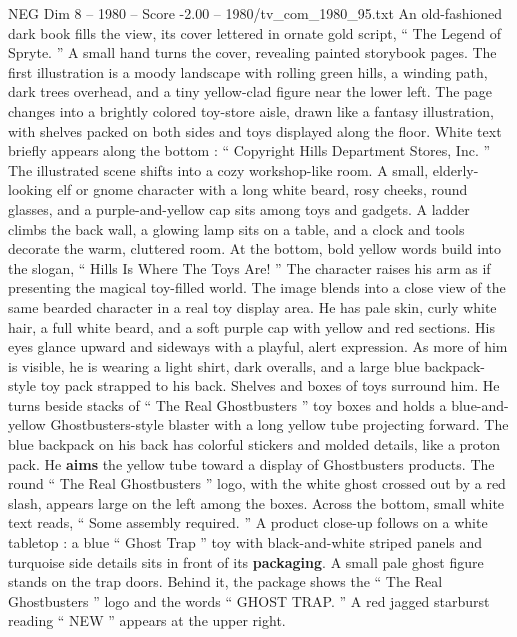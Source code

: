 \begin{textsample}{NEG Dim 8 – 1980 – Score -2.00 – 1980/tv\_com\_1980\_95.txt}  \label{ex:f8_neg_060}
An old-fashioned dark book fills the view, its cover lettered in ornate gold script, “ The Legend of Spryte. ” A small hand turns the cover, revealing painted storybook pages.
The first illustration is a moody landscape with rolling green hills, a winding path, dark trees overhead, and a tiny yellow-clad figure near the lower left.
The page changes into a brightly colored toy-store aisle, drawn like a fantasy illustration, with shelves packed on both sides and toys displayed along the floor.
White text briefly appears along the bottom : “ Copyright Hills Department Stores, Inc. ” The illustrated scene shifts into a cozy workshop-like room.
A small, elderly-looking elf or gnome character with a long white beard, rosy cheeks, round glasses, and a purple-and-yellow cap sits among toys and gadgets.
A ladder climbs the back wall, a glowing lamp sits on a table, and a clock and tools decorate the warm, cluttered room.
At the bottom, bold yellow words build into the slogan, “ Hills Is Where The Toys Are! ” The character raises his arm as if presenting the magical toy-filled world.
The image blends into a close view of the same bearded character in a real toy display area.
He has pale skin, curly white hair, a full white beard, and a soft purple cap with yellow and red sections.
His eyes glance upward and sideways with a playful, alert expression.
As more of him is visible, he is wearing a light shirt, dark overalls, and a large blue backpack-style toy pack strapped to his back.
Shelves and boxes of toys surround him.
He turns beside stacks of “ The Real Ghostbusters ” toy boxes and holds a blue-and-yellow Ghostbusters-style blaster with a long yellow tube projecting forward.
The blue backpack on his back has colorful stickers and molded details, like a proton pack.
He \textbf{aims} the yellow tube toward a display of Ghostbusters products.
The round “ The Real Ghostbusters ” logo, with the white ghost crossed out by a red slash, appears large on the left among the boxes.
Across the bottom, small white text reads, “ Some assembly required. ” A product close-up follows on a white tabletop : a blue “ Ghost Trap ” toy with black-and-white striped panels and turquoise side details sits in front of its \textbf{packaging}.
A small pale ghost figure stands on the trap doors.
Behind it, the package shows the “ The Real Ghostbusters ” logo and the words “ GHOST TRAP. ” A red jagged starburst reading “ NEW ” appears at the upper right.

\end{textsample}
